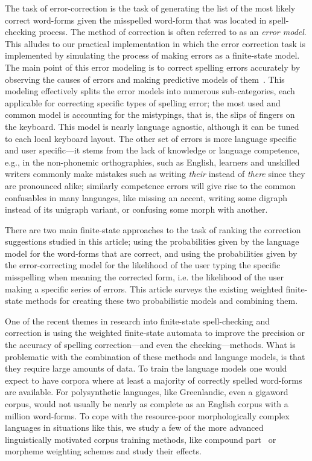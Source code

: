 \documentclass[a4paper,12pt]{article}
\begin{document}
The task of error-correction is the task of generating the list of the most
likely correct word-forms given the misspelled word-form that was located in
spell-checking process. The method of correction is often referred to as an
\emph{error model}. This alludes to our practical implementation in which the
error correction task is implemented by simulating the process of making errors
as a finite-state model. The main point of this error modeling is to correct
spelling errors accurately by observing the causes of errors and making
predictive models of them~\cite[]{deorowicz2005correcting}.  This modeling
effectively splits the error models into numerous sub-categories, each
applicable for correcting specific types of spelling error; the most used and
common model is accounting for the mistypings, that is, the slips of fingers on
the keyboard. This model is nearly language agnostic, although it can be tuned
to each local keyboard layout. The other set of errors is more language
specific and user specific---it stems from the lack of knowledge or language
competence, e.g.,  in the non-phonemic orthographies, such as English,
learners and unskilled writers commonly make mistakes such as writing
\emph{their} instead of \emph{there} since they are pronounced alike; similarly
competence errors will give rise to the common confusables in many languages,
like missing an accent, writing some digraph instead of its unigraph variant,
or confusing some morph with another.

There are two main finite-state approaches to the task of ranking the
correction suggestions studied in this article; using the probabilities given
by the language model for the word-forms that are correct, and using the
probabilities given by the error-correcting model for the likelihood of the
user typing the specific misspelling when meaning the corrected form, i.e. the
likelihood of the user making a specific series of errors. This article surveys
the existing weighted finite-state methods for creating these two probabilistic
models and combining them.

One of the recent themes in research into finite-state spell-checking and
correction is using the weighted finite-state automata to improve the precision
or the accuracy of spelling correction---and even the checking---methods.
What is problematic with the combination of these methods and language models,
is that they require large amounts of data. To train the language models one
would expect to have corpora where at least a majority of correctly spelled
word-forms are available.  For polysynthetic languages, like Greenlandic, even
a gigaword corpus, would not usually be nearly as complete as an English corpus
with a million word-forms. To cope with the resource-poor morphologically
complex languages in situations like this, we study a few of the more
advanced linguistically motivated corpus training methods, like compound
part~\cite[]{pirinen/2009/nodalida} or morpheme weighting schemes and study
their effects.
\end{document}
